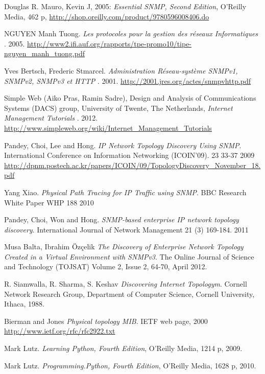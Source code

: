 \begin{thebibliography}{9}

  Douglas R. Mauro, Kevin J, 2005:
  \emph{Essential SNMP, Second Edition},
  O'Reilly Media, 462 p,
  \url{http://shop.oreilly.com/product/9780596008406.do}
  
   NGUYEN Manh Tuong.
  \emph{Les protocoles pour la gestion des réseaux Informatiques }.
  2005.
  \url{http://www2.ifi.auf.org/rapports/tpe-promo10/tipe-nguyen_manh_tuong.pdf}
  
   Yves Bertsch, Frederic Stmarcel.
  \emph{Administration Réseau-système SNMPv1, SNMPv2, SNMPv3 et HTTP }.
  2001.
  \url{http://2001.jres.org/actes/snmpvhttp.pdf}
  
   Simple Web (Aiko Pras, Ramin Sadre), Design and Analysis of Communications Systems (DACS) group, University of Twente, The Netherlands, 
  \emph{Internet Management Tutorials }.
  2012.
  \url{http://www.simpleweb.org/wiki/Internet_Management_Tutorials}

Pandey, Choi, Lee and Hong.
\emph{IP Network Topology Discovery Using SNMP}. 
International Conference on Information Networking (ICOIN'09). 23 33-37 2009
  \url{http://dpnm.postech.ac.kr/papers/ICOIN/09/TopologyDiscovery_November_18.pdf}

Yang Xiao.
\emph{Physical Path Tracing for IP Traffic using SNMP}. 
BBC Research White Paper WHP 188 2010

Pandey, Choi, Won and Hong.
\emph{SNMP-based enterprise IP network topology discovery}. 
 International Journal of Network Management 21 (3) 169-184. 2011
 
Musa Balta, Ibrahim Özçelik
\emph{The Discovery of Enterprise Network Topology Created in a Virtual
Environment with SNMPv3}. 
The Online Journal of Science and Technology (TOJSAT) Volume 2, Issue 2, 64-70, April 2012.


  R. Siamwalla, R. Sharma, S. Keshav
  \emph{Discovering Internet Topologym}.
   Cornell Network Research Group, Department of Computer Science, Cornell University, Ithaca, 1988.

Bierman and Jones 
\emph{Physical topology MIB}.
IETF web page, 2000
 \url{http://www.ietf.org/rfc/rfc2922.txt} 
 

  Mark Lutz.
  \emph{Learning Python, Fourth Edition},
  O'Reilly Media, 1214 p, 2009.
  
  Mark Lutz.
  \emph{Programming.Python, Fourth Edition},
  O'Reilly Media, 1628 p, 2010.

 
\end{thebibliography}